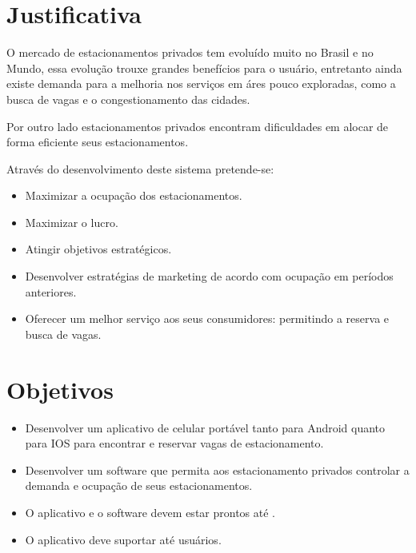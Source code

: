 
\section{Justificativa}

O mercado de estacionamentos privados tem evoluído muito no Brasil e no Mundo, essa evolução trouxe grandes benefícios para o usuário, entretanto ainda existe demanda para a melhoria nos serviços em áres pouco exploradas, como a busca de vagas e o congestionamento das cidades.

Por outro lado estacionamentos privados encontram dificuldades em alocar de forma eficiente seus estacionamentos.


Através do desenvolvimento deste sistema pretende-se:
\begin{itemize}
	\item Maximizar a ocupação dos estacionamentos.%
	\item Maximizar o lucro.
	\item Atingir objetivos estratégicos.
	\item Desenvolver estratégias de marketing de acordo com ocupação em períodos anteriores.
	\item Oferecer um melhor serviço aos seus consumidores: permitindo a reserva e busca de vagas.
\end{itemize}

\section{Objetivos}


\begin{itemize}
	\item Desenvolver um aplicativo de celular portável tanto para Android quanto para IOS para encontrar e reservar vagas de estacionamento.
	\item Desenvolver um software que permita aos estacionamento privados controlar a demanda e ocupação de seus estacionamentos.
	\item O aplicativo e o software devem estar prontos até \maximumDeadline.
	\item O aplicativo deve suportar até \minimumUsersAmount usuários.
\end{itemize}

